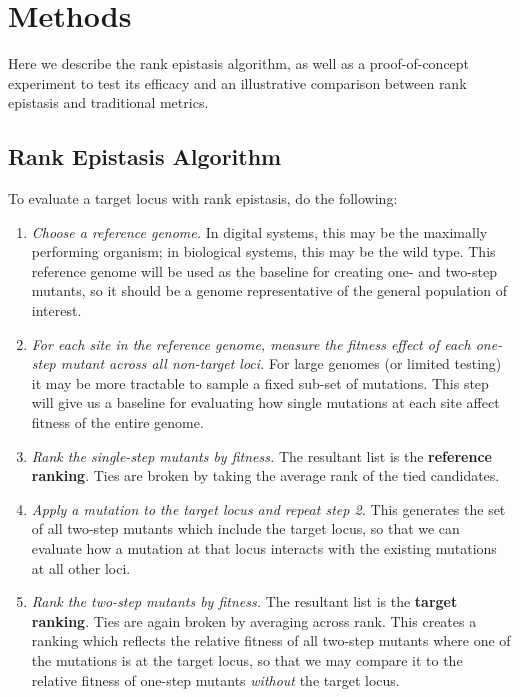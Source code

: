 \section{Methods}

Here we describe the rank epistasis algorithm, as well as a proof-of-concept experiment to test its efficacy and an illustrative comparison between rank epistasis and traditional metrics. 

\subsection{Rank Epistasis Algorithm}
To evaluate a target locus with rank epistasis, do the following: 

\begin{enumerate}

\item \textit{Choose a reference genome.} In digital systems, this may be the maximally performing organism; in biological systems, this may be the wild type. This reference genome will be used as the baseline for creating one- and two-step mutants, so it should be a genome representative of the general population of interest.

\item \textit{For each site in the reference genome, measure the fitness effect of each one-step mutant across all non-target loci.}  For large genomes (or limited testing) it may be more tractable to sample a fixed sub-set of mutations. This step will give us a baseline for evaluating how single mutations at each site affect fitness of the entire genome.

\item \textit{Rank the single-step mutants by fitness.} The resultant list is the \textbf{reference ranking}. Ties are broken by taking the average rank of the tied candidates. 

\item \textit{Apply a mutation to the target locus and repeat step 2.} This generates the set of all two-step mutants which include the target locus, so that we can evaluate how a mutation at that locus interacts with the existing mutations at all other loci.

\item \textit{Rank the two-step mutants by fitness.} The resultant list is the \textbf{target ranking}. Ties are again broken by averaging across rank. This creates a ranking which reflects the relative fitness of all two-step mutants where one of the mutations is at the target locus, so that we may compare it to the relative fitness of one-step mutants \textit{without} the target locus.


\end{enumerate}
